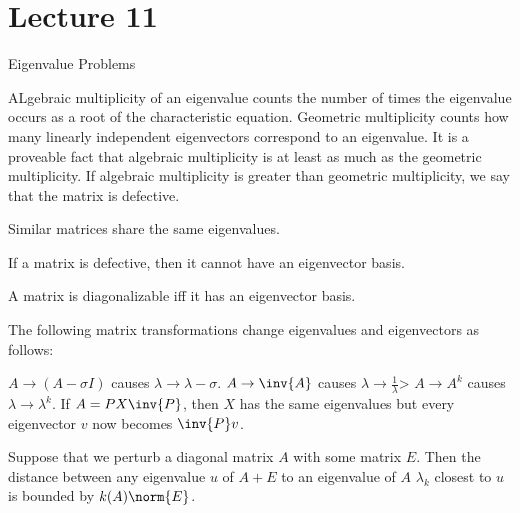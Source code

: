 \documentclass[../main.tex]{subfiles}
\begin{document}
\section{Lecture 11}{Eigenvalue Problems}


\begin{definition}
    ALgebraic multiplicity of an eigenvalue counts the number of times the eigenvalue occurs as a root of the characteristic equation. Geometric multiplicity counts how many linearly independent eigenvectors correspond to an eigenvalue. It is a proveable fact that 
    algebraic multiplicity is at least as much as the geometric multiplicity. If algebraic multiplicity is greater than geometric multiplicity, we say that the matrix is defective.
\end{definition}

\begin{theorem}
    Similar matrices share the same eigenvalues.
\end{theorem}

\begin{theorem}
    If a matrix is defective, then it cannot have an eigenvector basis.
\end{theorem}

\begin{proposition}
    A matrix is diagonalizable iff it has an eigenvector basis.
\end{proposition}

\begin{proposition}
    The following matrix transformations change eigenvalues and eigenvectors as follows:

    \begin{outline}
        \1 $A \rightarrow (A - \sigma I)$ causes $\lambda \rightarrow \lambda - \sigma$. 
        \1 $A \rightarrow \inv{A}$ causes $\lambda \to \frac{1}{\lambda}$>
        \1 $A \rightarrow A^k$ causes $\lambda \to \lambda^k$.
        \1 If $A = PX\inv{P}$, then $X$ has the same eigenvalues but every eigenvector $v$ now becomes $\inv{P}v$.
    \end{outline}
\end{proposition}

\begin{proposition}
    Suppose that we perturb a diagonal matrix $A$ with some matrix $E$. Then the distance between any eigenvalue $u$ of $A + E$ to an eigenvalue of $A$ $\lambda_k$ closest to $u$ is bounded by $k(A) \norm{E}$.
\end{proposition}
\end{document}
